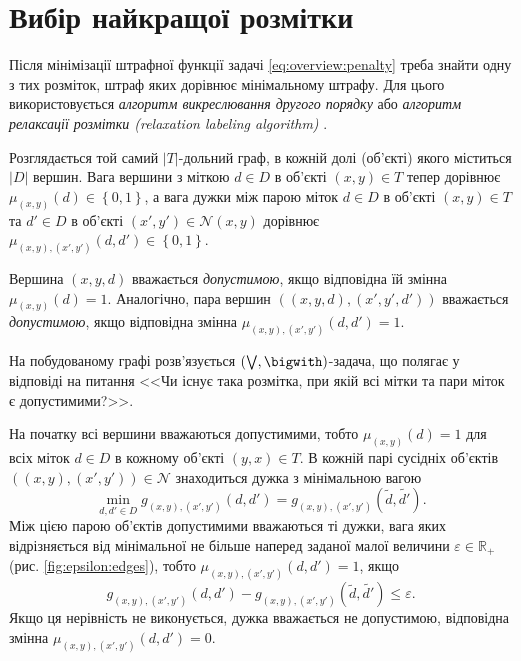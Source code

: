 \section{Вибір найкращої розмітки}

Після мінімізації штрафної функції задачі \eqref{eq:overview:penalty}
треба знайти одну з тих розміток, штраф яких дорівнює мінімальному штрафу.
Для цього використовується
\textit{алгоритм викреслювання другого порядку} або
\textit{алгоритм релаксації розмітки (relaxation labeling algorithm)}
\cite{overview:savchynskyy:diffusion}.

Розглядається той самий $\left| T \right|$-дольний граф,
в кожній долі (об'єкті) якого міститься $\left| D \right|$ вершин.
Вага вершини з міткою $d \in D$ в об'єкті $\left(x, y \right) \in T$
тепер дорівнює
$\mu_{\left(x, y \right)} \left( d \right) \in \left\{ 0, 1 \right\}$,
а вага дужки між парою міток $d \in D$ в об'єкті $\left( x, y \right) \in T$
та $d' \in D$ в об'єкті
$\left(x', y' \right) \in \mathcal{N} \left(x, y \right)$ дорівнює
$\mu_{\left(x, y \right), \left(x', y' \right)} \left(d, d' \right) \in
    \left\{ 0, 1 \right\}$.

Вершина $\left(x, y, d \right)$ вважається \textit{допустимою},
якщо відповідна їй змінна $\mu_{\left(x, y \right)} \left( d \right) = 1$.
Аналогічно,
пара вершин $\left( \left( x, y, d \right), \left(x', y', d' \right) \right)$
вважається \textit{допустимою}, якщо відповідна змінна
$\mu_{\left(x, y \right), \left(x', y' \right)} \left(d, d' \right) = 1$.

На побудованому графі розв'язується
$\left( \bigvee, \bigwith \right)$-задача, що полягає у відповіді на питання
<<Чи існує така розмітка, при якій всі мітки та пари міток є допустимими?>>.

На початку всі вершини вважаються допустимими, тобто
$\mu_{\left(x, y \right)} \left(d \right) = 1$ для всіх
міток $d \in D$ в кожному об'єкті $\left(y,x \right) \in T$.
В кожній парі сусідніх об'єктів
$\left( \left(x, y \right), \left(x', y' \right) \right) \in \mathcal{N}$
знаходиться дужка з мінімальною вагою
\begin{equation*}
\min \limits_{d, d' \in D} g_{\left(x, y \right), \left(x', y' \right)}
    \left(d, d' \right) =
    g_{\left(x, y \right), \left(x', y' \right)}
        \left(\tilde{d}, \tilde{d'} \right).
\end{equation*}
Між цією парою об'єктів допустимими вважаються ті дужки,
вага яких відрізняється від мінімальної не більше
наперед заданої малої величини $\varepsilon \in \mathbb{R}_+$
(рис. \ref{fig:epsilon:edges}), тобто
$\mu_{\left(x, y \right), \left(x', y' \right)} \left(d, d' \right) = 1$,
якщо
\begin{equation*}
    g_{\left(x, y \right), \left(x', y' \right)} \left(d, d' \right) -
    g_{\left(x, y \right), \left(x', y' \right)}
        \left(\tilde{d}, \tilde{d'} \right) \le
    \varepsilon.
\end{equation*}
Якщо ця нерівність не виконується, дужка вважається не допустимою,
відповідна змінна
$\mu_{\left(x, y \right), \left(x', y' \right)} \left(d, d' \right) = 0$.

